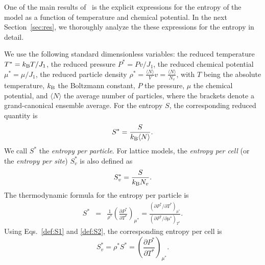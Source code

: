 \documentclass[entropy,article,submit,pdftex,moreauthors]{Definitions/mdpi}
\begin{document}
One of the main results of~\citep{RDKPS25arxiv} is the explicit expressions for the entropy of the model as a function of temperature and chemical potential. In the next Section~\ref{sec:res}, we thoroughly analyze the these expressions for the entropy in detail. 

We use the following standard dimensionless variables: the reduced temperature $T^*=k_{\rm B}T/J_1$, the reduced pressure $P^* = P v/J_1$, the reduced chemical potential $\mu^* = \mu/J_1$, the reduced particle density $\rho^* = \frac{\langle N \rangle}{V} v = \frac{\langle N \rangle}{N_v}$, with $T$ being the absolute temperature, $k_{\rm B}$ the Boltzmann constant, $P$ the pressure, $\mu$ the chemical potential, and $\langle N \rangle$ the average number of particles, where the brackets denote a grand-canonical ensemble average. For the entropy $S$, the corresponding reduced quantity is
\begin{equation}
	\label{def:S1}
	S^* = \frac{S}{k_{\rm B} \langle N \rangle}.
\end{equation}
We call $S^*$ the \textit{entropy per particle}. For lattice models, the \textit{entropy per cell} (or the \textit{entropy per site}) $S^*_v$ is also defined as
\begin{equation}
	\label{def:S2}
	S^*_v = \frac{S}{k_{\rm B} N_v}.
\end{equation}
The thermodynamic formula for the entropy per particle is
\begin{eqnarray}
	S^* & = & \frac{1}{\rho^*}\left(\frac{\partial P^*}{\partial T^*}\right)_{{\mu^*}}
	= \frac{(\partial P^* / \partial T^*)_{{\mu^*}}}{(\partial P^* / \partial \mu^*)_{T^*}}.
\end{eqnarray}
Using Eqs.~\eqref{def:S1} and \eqref{def:S2}, the corresponding entropy per cell is
\begin{equation}
	S^*_v = \rho^* S^* = \left(\frac{\partial P^*}{\partial T^*}\right)_{\mu^*}.
\end{equation}


\end{document}
